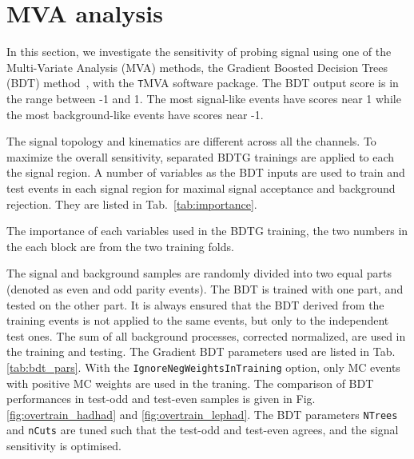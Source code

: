 \section{MVA analysis}
\label{sec:mva}

In this section, we investigate the sensitivity of probing signal using one of the Multi-Variate Analysis (MVA) methods, the Gradient Boosted Decision Trees (BDT) method~\cite{BDT,BDT2}, with the {\texttt TMVA} software package. The BDT output score is in the range between -1 and 1. The most signal-like events have scores near 1 while the most background-like events have scores near -1.

The signal topology and kinematics are different across all the channels. To maximize the overall sensitivity, separated BDTG trainings are applied to each the signal region. A number of variables as the BDT inputs are used to train and test events in each signal region for maximal signal acceptance and background rejection. They are listed in Tab.~\ref{tab:importance}. 

\begin{table}
\caption{The importance of each variables used in the BDTG training, the two numbers in the each block are from the two training folds.}

\end{table}

The signal and background samples are randomly divided into two equal parts (denoted as even and odd parity events). The BDT is trained with one part, and tested on the other part. It is always ensured that the BDT derived from the training events is not applied to the same events, but only to the independent test ones. The sum of all background processes, corrected normalized, are used in the training and testing. The Gradient BDT parameters used are listed in Tab. \ref{tab:bdt_pars}. With the \texttt{IgnoreNegWeightsInTraining} option, only MC events with positive MC weights are used in the traning. The comparison of BDT performances in test-odd and test-even samples is given in Fig. \ref{fig:overtrain_hadhad} and \ref{fig:overtrain_lephad}. The BDT parameters \texttt{NTrees} and \texttt{nCuts} are tuned such that the test-odd and test-even agrees, and the signal sensitivity is optimised.

